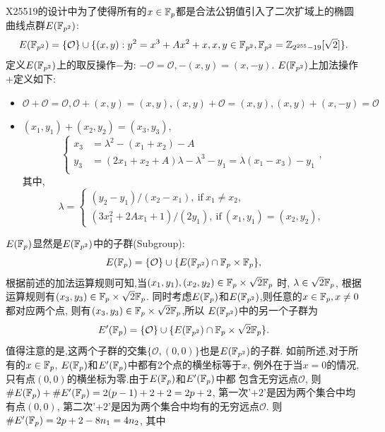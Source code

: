 X25519的设计中为了使得所有的$x\in\mathbb{F}_p$都是合法公钥值引入了二次扩域上的椭圆曲线点群$E(\mathbb{F}_{p^2})$:
$$E(\mathbb{F}_{p^2}) = \{ \mathcal{O} \}  \cup \{ (x,y): y^2 = x^3 + Ax^2 + x,  x, y \in \mathbb{F}_{p^2}, \mathbb{F}_{p^2} = \mathbb{Z}_{2^{255}-19}[\sqrt{2}] \}.$$
定义$E(\mathbb{F}_{p^2})$上的取反操作$-$为: $-\mathcal{O} = \mathcal{O}, -(x,y) = (x,-y)$.
$E(\mathbb{F}_{p^2})$上加法操作$+$定义如下:
\begin{itemize}
\item $\mathcal{O} + \mathcal{O} = \mathcal{O}, \mathcal{O} + (x,y) = (x,y), 
(x,y) + \mathcal{O} = (x,y), (x,y) + (x,-y) = \mathcal{O}$
\item $(x_1, y_1) + (x_2, y_2) = (x_3, y_3)$,
\begin{equation*}
\left\{
\begin{array}{ll}
x_3 & = \lambda^2 - (x_1 + x_2) - A\\
y_3 & = (2x_1 + x_2 + A)\lambda - \lambda^3 - y_1 = \lambda(x_1 - x_3) - y_1\\
\end{array},
\right.
\end{equation*}
其中,
\begin{equation*}
\lambda = 
\left\{
\begin{array}{ll}
(y_2-y_1) / (x_2-x_1),\ \text{if}\ x_1 \neq x_2,\\
(3x_1^2 + 2Ax_1 + 1) / (2y_1),\ \text{if}\ (x_1,y_1) =(x_2,y_2),
\end{array}
\right.
\end{equation*}
\end{itemize}
$E(\mathbb{F}_{p})$显然是$E(\mathbb{F}_{p^2})$中的子群(Subgroup):
$$E(\mathbb{F}_{p}) = \{ \mathcal{O} \} \cup \{ E(\mathbb{F}_{p^2}) \cap \mathbb{F}_p \times \mathbb{F}_p\},$$
根据前述的加法运算规则可知,当$(x_1, y_1), (x_2, y_2) \in  \mathbb{F}_p \times \sqrt{2}\mathbb{F}_{p}$ 时,
$\lambda \in \sqrt{2}\mathbb{F}_p$, 根据运算规则有$(x_3, y_3) \in  \mathbb{F}_p \times \sqrt{2}\mathbb{F}_{p}$.
同时考虑$E(\mathbb{F}_{p})$和$E(\mathbb{F}_{p^2})$,则任意的$x\in\mathbb{F}_p, x \neq 0$都对应两个点,
则有$(x_3, y_3) \in  \mathbb{F}_p \times \sqrt{2}\mathbb{F}_{p}$,所以
$E(\mathbb{F}_{p^2})$中的另一个子群为
$$E'(\mathbb{F}_{p}) = \{ \mathcal{O} \} \cup \{ E(\mathbb{F}_{p^2}) \cap \mathbb{F}_p \times \sqrt{2}\mathbb{F}_{p}\}.$$
值得注意的是,这两个子群的交集$\{ \mathcal{O}, (0,0) \}$也是$E(\mathbb{F}_{p^2})$的子群.
如前所述,对于所有的$x\in\mathbb{F}_p$,  $E(\mathbb{F}_{p})$和$E'(\mathbb{F}_{p})$中都有2个点的横坐标等于$x$,
例外在于当$x=0$的情况,只有点$(0,0)$的横坐标为零.由于$E(\mathbb{F}_{p})$和$E'(\mathbb{F}_{p})$中都
包含无穷远点$\mathcal{O}$, 则 $\#E(\mathbb{F}_{p})+\#E'(\mathbb{F}_{p}) = 2(p-1) + 2 + 2 = 2p + 2$,
第一次'$+2$'是因为两个集合中均有点$(0,0)$, 第二次'$+2$'是因为两个集合中均有的无穷远点$\mathcal{O}$.
则$\#E'(\mathbb{F}_p) = 2p + 2 - 8n_1 = 4n_2$, 其中
